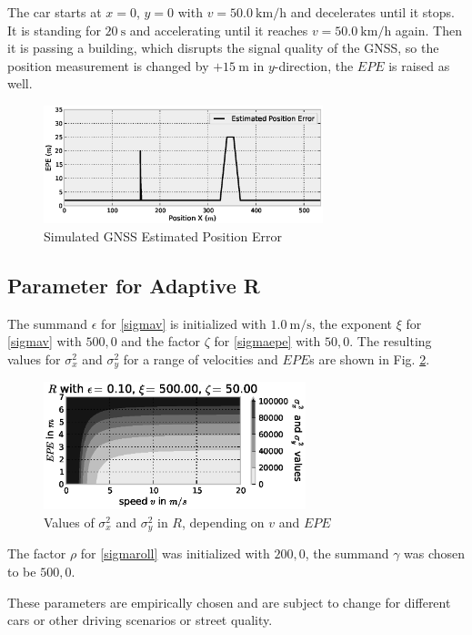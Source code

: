 \documentclass[conference]{IEEEtran}
\begin{document}
The car starts at $x=0$, $y=0$ with $v=\SI{50.0}{\kilo\metre\per\hour}$ and decelerates until it stops. It is standing for $\SI{20}{\second}$ and accelerating until it reaches $v=\SI{50.0}{\kilo\metre\per\hour}$ again. Then it is passing a building, which disrupts the signal quality of the GNSS, so the position measurement is changed by $+\SI{15}{\metre}$ in $y$-direction, the $EPE$ is raised as well.

\begin{figure}[ht]
\centering
\includegraphics[width=3.2in]{images/Testdata-EPE}
\caption{Simulated GNSS Estimated Position Error}
\label{Testdata-EPE}
\end{figure}

\subsection{Parameter for Adaptive R}

The summand $\epsilon$ for \eqref{sigmav} is initialized with $\SI{1.0}{\metre\per\second}$, the exponent $\xi$ for \eqref{sigmav} with $500{,}0$ and the factor $\zeta$ for \eqref{sigmaepe} with $50{,}0$. The resulting values for $\sigma_x^2$ and $\sigma_y^2$ for a range of velocities and $EPE$s are shown in Fig. \ref{R1}.

\begin{figure}[ht]
\centering
\includegraphics[width=3.0in]{images/R}
\caption{Values of $\sigma_x^2$ and $\sigma_y^2$ in $R$, depending on $v$ and $EPE$}
\label{R1}
\end{figure}

The factor $\rho$ for \eqref{sigmaroll} was initialized with $200{,}0$, the summand $\gamma$ was chosen to be $500{,}0$.

These parameters are empirically chosen and are subject to change for different cars or other driving scenarios or street quality.
\end{document}
